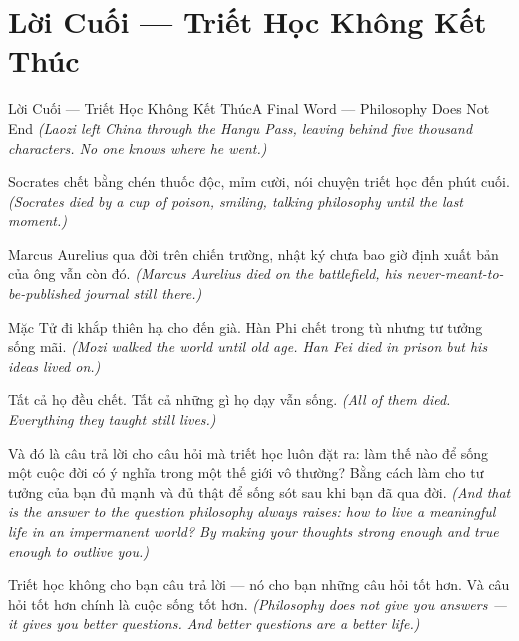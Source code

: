 \section{Lời Cuối — Triết Học Không Kết Thúc}
\begin{truyen}{Lời Cuối — Triết Học Không Kết Thúc}{A Final Word — Philosophy Does Not End}
\textit{(Laozi left China through the Hangu Pass, leaving behind five thousand characters. No one knows where he went.)}

Socrates chết bằng chén thuốc độc, mỉm cười, nói chuyện triết học đến phút cuối.
\textit{(Socrates died by a cup of poison, smiling, talking philosophy until the last moment.)}

Marcus Aurelius qua đời trên chiến trường, nhật ký chưa bao giờ định xuất bản của ông vẫn còn đó.
\textit{(Marcus Aurelius died on the battlefield, his never-meant-to-be-published journal still there.)}

Mặc Tử đi khắp thiên hạ cho đến già. Hàn Phi chết trong tù nhưng tư tưởng sống mãi.
\textit{(Mozi walked the world until old age. Han Fei died in prison but his ideas lived on.)}

Tất cả họ đều chết. Tất cả những gì họ dạy vẫn sống.
\textit{(All of them died. Everything they taught still lives.)}

Và đó là câu trả lời cho câu hỏi mà triết học luôn đặt ra: làm thế nào để sống một cuộc đời có ý nghĩa trong một thế giới vô thường? Bằng cách làm cho tư tưởng của bạn đủ mạnh và đủ thật để sống sót sau khi bạn đã qua đời.
\textit{(And that is the answer to the question philosophy always raises: how to live a meaningful life in an impermanent world? By making your thoughts strong enough and true enough to outlive you.)}

\end{truyen}

\begin{baihoc}
Triết học không cho bạn câu trả lời — nó cho bạn những câu hỏi tốt hơn. Và câu hỏi tốt hơn chính là cuộc sống tốt hơn.
\textit{(Philosophy does not give you answers — it gives you better questions. And better questions are a better life.)}
\end{baihoc}
\ngancach

